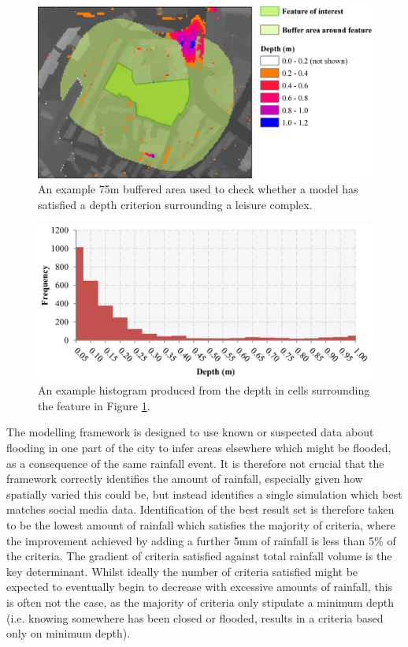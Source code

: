 \begin{figure}[tpb]
	\centering
	\includegraphics[width=1.0\textwidth]{nowcasting-figures/nclsm-example-buffer.png}
	\caption{An example 75m buffered area used to check whether a model has satisfied a depth criterion surrounding a leisure complex.}
	\label{NclSM-Example-Buffer}
\end{figure}

\begin{figure}[tpb]
	\centering
	\includegraphics[width=1.0\textwidth]{nowcasting-figures/nclsm-example-histogram.png}
	\caption{An example histogram produced from the depth in cells surrounding the feature in Figure \ref{NclSM-Example-Buffer}.}
	\label{NclSM-Example-Histogram}
\end{figure}

The modelling framework is designed to use known or suspected data about flooding in one part of the city to infer areas elsewhere which might be flooded, as a consequence of the same rainfall event. It is therefore not crucial that the framework correctly identifies the amount of rainfall, especially given how spatially varied this could be, but instead identifies a single simulation which best matches social media data. Identification of the best result set is therefore taken to be the lowest amount of rainfall which satisfies the majority of criteria, where the improvement achieved by adding a further 5mm of rainfall is less than 5\% of the criteria. The gradient of criteria satisfied against total rainfall volume is the key determinant. Whilst ideally the number of criteria satisfied might be expected to eventually begin to decrease with excessive amounts of rainfall, this is often not the case, as the majority of criteria only stipulate a minimum depth (i.e. knowing somewhere has been closed or flooded, results in a criteria based only on minimum depth). 

